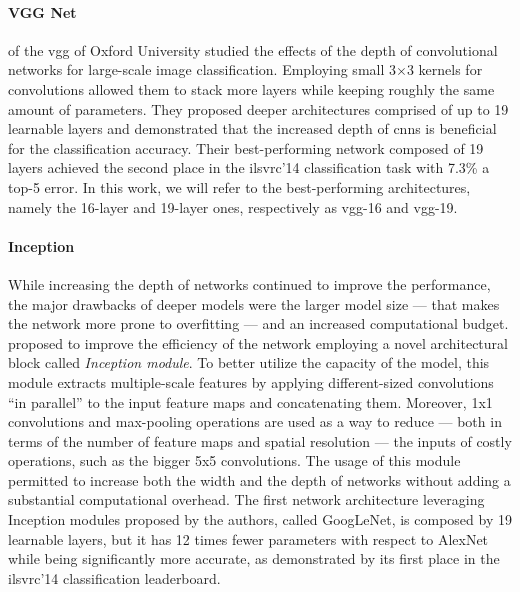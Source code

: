 \paragraph{VGG Net} %
\citet{simonyan2014very} of the \gls{vgg} of Oxford University studied the effects of the depth of convolutional networks for large-scale image classification.
Employing small 3$\times$3 kernels for convolutions allowed them to stack more layers while keeping roughly the same amount of parameters.
They proposed deeper architectures comprised of up to 19 learnable layers and demonstrated that the increased depth of \glspl{cnn} is beneficial for the classification accuracy.
Their best-performing network composed of 19 layers achieved the second place in the \gls{ilsvrc}'14 classification task with 7.3\% a top-5 error.
In this work, we will refer to the best-performing architectures, namely the 16-layer and 19-layer ones, respectively as \gls{vgg}-16 and \gls{vgg}-19.

\paragraph{Inception}
While increasing the depth of networks continued to improve the performance, the major drawbacks of deeper models were the larger model size --- that makes the network more prone to overfitting --- and an increased computational budget.
\citet{szegedy2015going} proposed to improve the efficiency of the network employing a novel architectural block called \emph{Inception module}.
To better utilize the capacity of the model, this module extracts multiple-scale features by applying different-sized convolutions ``in parallel'' to the input feature maps and concatenating them.
Moreover, 1x1 convolutions and max-pooling operations are used as a way to reduce --- both in terms of the number of feature maps and spatial resolution --- the inputs of costly operations, such as the bigger 5x5 convolutions.
The usage of this module permitted to increase both the width and the depth of networks without adding a substantial computational overhead.
The first network architecture leveraging Inception modules proposed by the authors, called GoogLeNet, is composed by 19 learnable layers, but it has 12 times fewer parameters with respect to AlexNet while being significantly more accurate, as demonstrated by its first place in the \gls{ilsvrc}'14 classification leaderboard.



